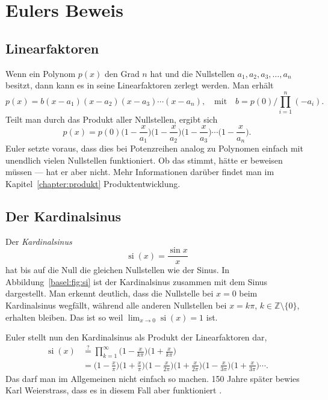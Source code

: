 %
%
%
%
\section{Eulers Beweis
\label{basel:section:beweis}}

\subsection{Linearfaktoren}
\label{basel:subsection:linearfaktoren}
 
Wenn ein Polynom $p(x)$ den Grad $n$ hat und die Nullstellen $a_1, a_2, a_3, \ldots, a_n$ besitzt,
dann kann es in seine Linearfaktoren zerlegt werden.
Man erhält
\[
    p(x) = b(x - a_1)(x - a_2)(x - a_3) \cdots (x - a_n),
    \quad\text{mit}\quad
    b = p(0) \Big/ \prod_{i=1}^{n} (-a_i).
\]
Teilt man durch das Produkt aller Nullstellen, ergibt sich
\[
    p(x)
    =
    p(0)
    \biggl(1 - \frac{x}{a_1}\biggr)
    \biggl(1 - \frac{x}{a_2}\biggr)
    \biggl(1 - \frac{x}{a_3}\biggr)
    \cdots
    \biggl(1 - \frac{x}{a_n}\biggr).
\]
Euler setzte voraus, dass dies bei Potenzreihen analog zu Polynomen einfach mit unendlich vielen Nullstellen funktioniert.
Ob das stimmt, hätte er beweisen müssen --- hat er aber nicht.  Mehr Informationen darüber findet man im Kapitel~\ref{chapter:produkt} Produktentwicklung.
%
 
\subsection{Der Kardinalsinus
\label{basel:subsection:kardinalsinus}}
%
 
Der \emph{Kardinalsinus}
\[
    \operatorname{si}(x) = \frac{\sin x}{x}
\]
hat bis auf die Null die gleichen Nullstellen wie der Sinus.
In Abbildung~\ref{basel:fig:si} ist der Kardinalsinus zusammen mit dem Sinus dargestellt.
Man erkennt deutlich, dass die Nullstelle bei $x = 0$ beim Kardinalsinus wegfällt,
während alle anderen Nullstellen bei $x = k\pi$, $k \in \mathbb{Z} \setminus \{0\}$, erhalten bleiben.
Das ist so weil $\lim_{x\to 0}\operatorname{si}(x)=1$ ist.


Euler stellt nun den Kardinalsinus als Produkt der Linearfaktoren dar,
\begin{align*}
    \operatorname{si}(x)
    &\stackrel{?}{=}
    \prod_{k=1}^{\infty}
    \biggl(1 - \frac{x}{k\pi}\biggr)
    \biggl(1 + \frac{x}{k\pi}\biggr)
    \\
    &=
    \biggl(1 - \frac{x}{\pi}\biggr)
    \biggl(1 + \frac{x}{\pi}\biggr)
    \biggl(1 - \frac{x}{2\pi}\biggr)
    \biggl(1 + \frac{x}{2\pi}\biggr)
    \biggl(1 - \frac{x}{3\pi}\biggr)
    \biggl(1 + \frac{x}{3\pi}\biggr)
    \cdots.
\end{align*}
Das darf man im Allgemeinen nicht einfach so machen.
150 Jahre später bewies Karl Weierstrass, dass es in diesem Fall aber funktioniert \cite{basel:brilliant.org}.
%
 
